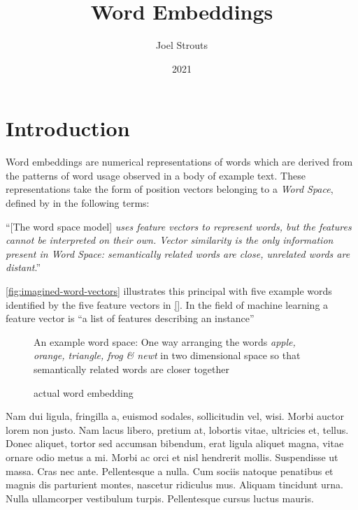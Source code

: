 \documentclass{ucetd}
\title{Word Embeddings}
\author{Joel Strouts}
\date{2021}
\begin{document}
\maketitle


\tableofcontents
{}
\chapter*{Introduction}

Word embeddings are numerical representations of words which are derived from the patterns of word usage observed in a body of example text. These representations take the form of position vectors belonging to a \textit{Word Space}, defined by \textcite{shutze-1993-word-space} in the following terms:

\begin{itquote}
  ``[The word space model] \emph{uses feature vectors to represent words, but the features cannot be interpreted on their own. Vector similarity is the only information present in Word Space: semantically related words are close, unrelated words are distant}.''
\end{itquote} 

\autoref{fig:imagined-word-vectors} illustrates this principal with five example words identified by the five feature vectors in \autoref{}. In the field of machine learning a feature vector is ``a list of features describing an instance''\smartcite{provost-1998-glossary}

\begin{wrapfigure}{R}{0.5\textwidth}
  \centering
  \caption{An example word space: One way arranging the words \emph{apple, orange, triangle, frog \& newt} in two dimensional space so that semantically related words are closer together}
\end{wrapfigure}\label{fig:imagined-word-vectors}


\begin{figure}[ht]
 \centering
 
 \caption{actual word embedding}
 \label{fig:uk-keyboard}
\end{figure}
Nam dui ligula, fringilla a, euismod sodales, sollicitudin vel, wisi. Morbi 
auctor lorem non justo. Nam lacus libero, pretium at, lobortis vitae, 
ultricies et, tellus. Donec aliquet, tortor sed accumsan bibendum, erat 
ligula aliquet magna, vitae ornare odio metus a mi. Morbi ac orci et nisl 
hendrerit mollis. Suspendisse ut massa. Cras nec ante. Pellentesque a nulla. 
Cum sociis natoque penatibus et magnis dis parturient montes, nascetur 
ridiculus mus. Aliquam tincidunt urna. Nulla ullamcorper vestibulum turpis. 
Pellentesque cursus luctus mauris.
\end{document}
